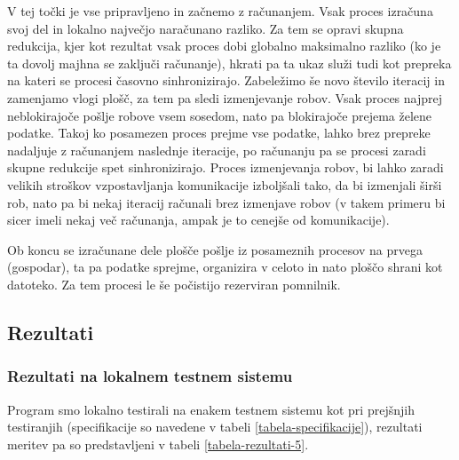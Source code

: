 \documentclass[a4paper,titlepage,11pt]{article}
\begin{document}
V tej točki je vse pripravljeno in začnemo z računanjem. Vsak proces izračuna svoj del in lokalno največjo naračunano razliko. Za tem se opravi skupna redukcija, kjer kot rezultat vsak proces dobi globalno maksimalno razliko (ko je ta dovolj majhna se zaključi računanje), hkrati pa ta ukaz služi tudi kot prepreka na kateri se procesi časovno sinhronizirajo. Zabeležimo še novo število iteracij in zamenjamo vlogi plošč, za tem pa sledi izmenjevanje robov. Vsak proces najprej neblokirajoče pošlje robove vsem sosedom, nato pa blokirajoče prejema želene podatke. Takoj ko posamezen proces prejme vse podatke, lahko brez prepreke nadaljuje z računanjem naslednje iteracije, po računanju pa se procesi zaradi skupne redukcije spet sinhronizirajo. Proces izmenjevanja robov, bi lahko zaradi velikih stroškov vzpostavljanja komunikacije izboljšali tako, da bi izmenjali širši rob, nato pa bi nekaj iteracij računali brez izmenjave robov (v takem primeru bi sicer imeli nekaj več računanja, ampak je to cenejše od komunikacije).

Ob koncu se izračunane dele plošče pošlje iz posameznih procesov na prvega (gospodar), ta pa podatke sprejme, organizira v celoto in nato ploščo shrani kot datoteko. Za tem procesi le še počistijo rezerviran pomnilnik.

\subsection{Rezultati}

\subsubsection{Rezultati na lokalnem testnem sistemu}

Program smo lokalno testirali na enakem testnem sistemu kot pri prejšnjih testiranjih (specifikacije so navedene v tabeli \ref{tabela-specifikacije}), rezultati meritev pa so predstavljeni v tabeli \ref{tabela-rezultati-5}.
\end{document}
